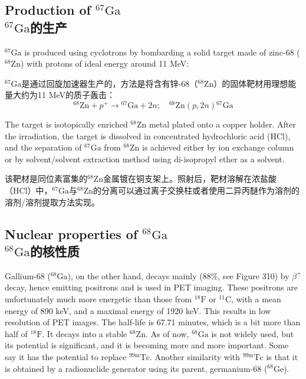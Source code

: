 \documentclass[dvipsnames, svgnames,a4paper,11pt]{article}
\begin{document}
\subsection{Production of \(\mathrm{^{67}Ga}\)\\ \(\mathrm{^{67}Ga}\)的生产}  
\(\mathrm{^{67}Ga}\) is produced using cyclotrons by bombarding a solid target made of zinc-68 (\(\mathrm{^{68}Zn}\)) with protons of ideal energy around 11 MeV:

\(\mathrm{^{67}Ga}\)是通过回旋加速器生产的，方法是将含有锌-68（\(\mathrm{^{68}Zn}\)）的固体靶材用理想能量大约为11 MeV的质子轰击：
\[
\mathrm{^{68}Zn} + p^{+} \rightarrow \mathrm{^{67}Ga} + 2n; \quad \mathrm{^{68}Zn}(p, 2n)\mathrm{^{67}Ga}
\]

The target is isotopically enriched \(\mathrm{^{68}Zn}\) metal plated onto a copper holder. After the irradiation, the target is dissolved in concentrated hydrochloric acid (HCl), and the separation of \(\mathrm{^{67}Ga}\) from \(\mathrm{^{68}Zn}\) is achieved either by ion exchange column or by solvent/solvent extraction method using di-isopropyl ether as a solvent.

该靶材是同位素富集的\(\mathrm{^{68}Zn}\)金属镀在铜支架上。照射后，靶材溶解在浓盐酸（HCl）中，\(\mathrm{^{67}Ga}\)与\(\mathrm{^{68}Zn}\)的分离可以通过离子交换柱或者使用二异丙醚作为溶剂的溶剂/溶剂提取方法实现。

\subsection{Nuclear properties of \(\mathrm{^{68}Ga}\)\\ \(\mathrm{^{68}Ga}\)的核性质}  
Gallium-68 (\(\mathrm{^{68}Ga}\)), on the other hand, decays mainly (88\%, see Figure 310) by \(\beta^{+}\) decay, hence emitting positrons and is used in PET imaging. These positrons are unfortunately much more energetic than those from \(\mathrm{^{18}F}\) or \(\mathrm{^{11}C}\), with a mean energy of 890 keV, and a maximal energy of 1920 keV. This results in low resolution of PET images. The half-life is 67.71 minutes, which is a bit more than half of \(\mathrm{^{18}F}\). It decays into a stable \(\mathrm{^{68}Zn}\). As of now, \(\mathrm{^{68}Ga}\) is not widely used, but its potential is significant, and it is becoming more and more important. Some say it has the potential to replace \(\mathrm{^{99m}Tc}\). Another similarity with \(\mathrm{^{99m}Tc}\) is that it is obtained by a radionuclide generator using its parent, germanium-68 (\(\mathrm{^{68}Ge}\)).
\end{document}
